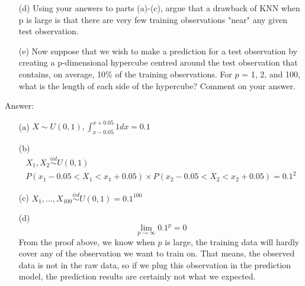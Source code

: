 \documentclass[12pt,a4paper]{article}%
\theoremstyle{definition}
\theoremstyle{plain}
\numberwithin{equation}{section}
\begin{document}
\begin{enumerate}
\begin{enumerate}
\item[(d)] Using your answers to parts (a)-(c), argue that a drawback of KNN when p is large is that there are very few training observations "near" any given test observation.

\item[(e)] Now suppose that we wish to make a prediction for a test observation by creating a p-dimensional hypercube centred around the test observation that contains, on average, 10\% of the training observations. 
For $p$ = 1, 2, and 100, what is the length of each side of the hypercube? Comment on your answer.

\end{enumerate}
\end{enumerate}


\begin{oframed}
Answer:
\begin{enumerate}
\item[(a)] $ X \sim U(0,1), \int_{x-0.05}^{x+0.05} 1 dx =0.1 $
\item[(b)] 
\begin{gather*}
X_{1},X_{2} \stackrel{iid}{\sim} U(0,1) \\
P(x_{1}-0.05<X_{1}<x_{1}+0.05) \times P(x_{2}-0.05<X_{2}<x_{2}+0.05) = 0.1^2
\end{gather*}
\item[(c)] $ X_{1},\dots,X_{100} \stackrel{iid}{\sim} U(0,1) = 0.1^{100}$
\item[(d)] $$\lim_{p\to\infty} 0.1^{p} = 0 $$ From the proof above, we know when $p$ is large, the training data will hardly cover any of the observation we want to train on.
That means, the observed data is not in the raw data, so if we plug this observation in the prediction model, the prediction results are certainly not what we expected.
\end{enumerate}
\end{oframed}
\end{document}

